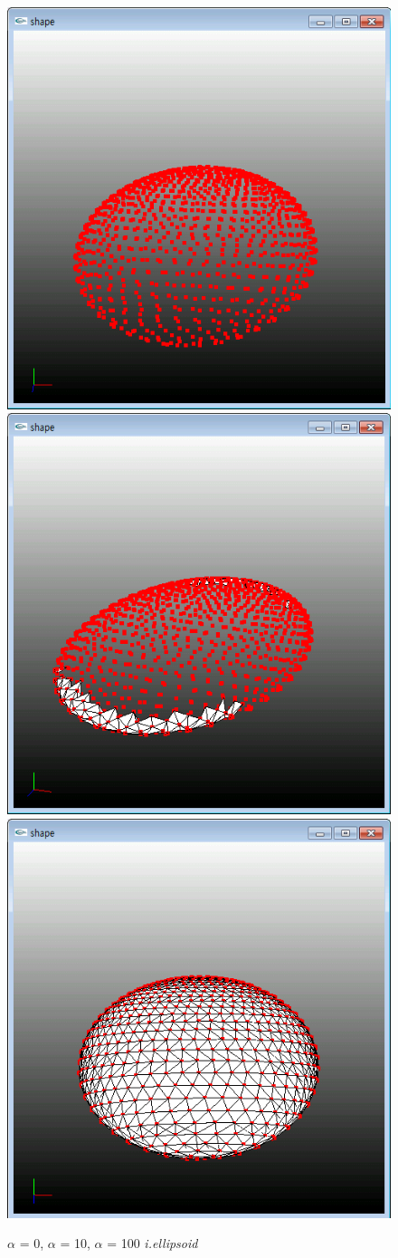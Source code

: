 \documentclass[11pt]{article}
\begin{document}
\begin{figure}[ht]
\includegraphics[width=.5\textwidth]{FIGS/alpha0-iellipsoid}
\hspace{1cm}
\includegraphics[width=.5\textwidth]{FIGS/alpha10-iellipsoid}
\vspace{1cm}
\includegraphics[width=.5\textwidth]{FIGS/alpha100-iellipsoid}
\caption{$\alpha$ = 0, $\alpha$ = 10, $\alpha$ = 100 \textit{i.ellipsoid}}
\end{figure}
\end{document}

